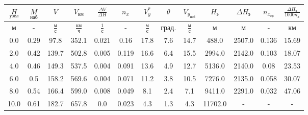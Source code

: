 \begin{tabular}{|c|c|c|c|c|c|c|c|c|c|c|c|c|}
\hline
$\underset{узел}{H}$ & $\underset{наб}{M}$ & $V$ & $V_{км}$ & $\frac{\Delta V}{\Delta H}$ & $n_x$ & $V_{y}^*$ & $\theta$ & $V_{y_{наб}}$ & $H_э$ & $\Delta H_э$ & $n_{x_{ср}}$ & $\frac{\Delta H_{э}}{1000 n_x}$ \\ 
\hline
м & - & $\frac{м}{с}$ & $\frac{км}{ч}$ & $\frac{1}{с}$ & - & $\frac{м}{с}$ & $град.$ & $\frac{м}{с}$ & м & м & - & км \\ 
\hline
0.0 & 0.29 & 97.8 & 352.1 & 0.021 & 0.16 & 17.8 & 7.6 & 14.7 & 488.0 & 2507.0 & 0.136 & 15.69 \\ 
\hline
2.0 & 0.42 & 139.7 & 502.8 & 0.005 & 0.119 & 16.6 & 6.4 & 15.5 & 2994.0 & 2142.0 & 0.103 & 18.07 \\ 
\hline
4.0 & 0.46 & 149.3 & 537.5 & 0.004 & 0.091 & 13.6 & 4.9 & 12.7 & 5136.0 & 2140.0 & 0.08 & 23.53 \\ 
\hline
6.0 & 0.5 & 158.2 & 569.6 & 0.004 & 0.071 & 11.2 & 3.8 & 10.5 & 7276.0 & 2135.0 & 0.058 & 30.07 \\ 
\hline
8.0 & 0.54 & 166.4 & 599.0 & 0.008 & 0.049 & 8.1 & 2.4 & 7.1 & 9411.0 & 2291.0 & 0.032 & 47.06 \\ 
\hline
10.0 & 0.61 & 182.7 & 657.8 & 0.0 & 0.023 & 4.3 & 1.3 & 4.3 & 11702.0 & - & - & - \\ 
\hline
\end{tabular}